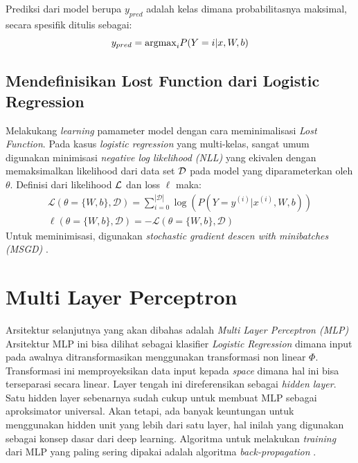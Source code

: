 Prediksi dari model berupa $y_{pred}$ adalah kelas dimana probabilitasnya maksimal, secara spesifik ditulis sebagai:
\begin{equation}
y_{pred} = {\rm argmax}_i P(Y=i|x,W,b)
\end{equation}

\subsection{Mendefinisikan Lost Function dari Logistic Regression}
Melakukang \textit{learning} pamameter model dengan cara meminimalisasi \textit{Lost Function}. Pada kasus \textit{logistic regression} yang multi-kelas, sangat umum digunakan minimisasi \textit{negative log likelihood (NLL)} yang ekivalen dengan memaksimalkan likelihood dari data set $\cal{D}$ pada model yang diparameterkan oleh $\theta$. Definisi dari likelihood $\cal{L}$ dan loss $\ell$ maka:
\begin{equation}
\begin{aligned}
\mathcal{L} (\theta=\{W,b\}, \mathcal{D}) =
  \sum_{i=0}^{|\mathcal{D}|} \log(P(Y=y^{(i)}|x^{(i)}, W,b)) \\
\ell (\theta=\{W,b\}, \mathcal{D}) = - \mathcal{L} (\theta=\{W,b\}, \mathcal{D})
\end{aligned}
\end{equation}
Untuk meminimisasi, digunakan \textit{stochastic gradient descen with minibatches (MSGD)} \citep{hinton2006fast}.


\section{Multi Layer Perceptron}

Arsitektur selanjutnya yang akan dibahas adalah \textit{Multi Layer Perceptron (MLP)} Arsitektur MLP ini bisa dilihat sebagai klasifier \textit{Logistic Regression} dimana input pada awalnya ditransformasikan menggunakan transformasi non linear $\Phi$. Transformasi ini memproyeksikan data input kepada \textit{space} dimana hal ini bisa terseparasi secara linear. Layer tengah ini direferensikan sebagai \textit{hidden layer}. Satu hidden layer sebenarnya sudah cukup untuk membuat MLP sebagai aproksimator universal. Akan tetapi, ada banyak keuntungan untuk menggunakan hidden unit yang lebih dari satu layer, hal inilah yang digunakan sebagai konsep dasar dari deep learning. Algoritma untuk melakukan \textit{training} dari MLP yang paling sering dipakai adalah algoritma \textit{back-propagation} \citep{tutorial2014lisa}.

